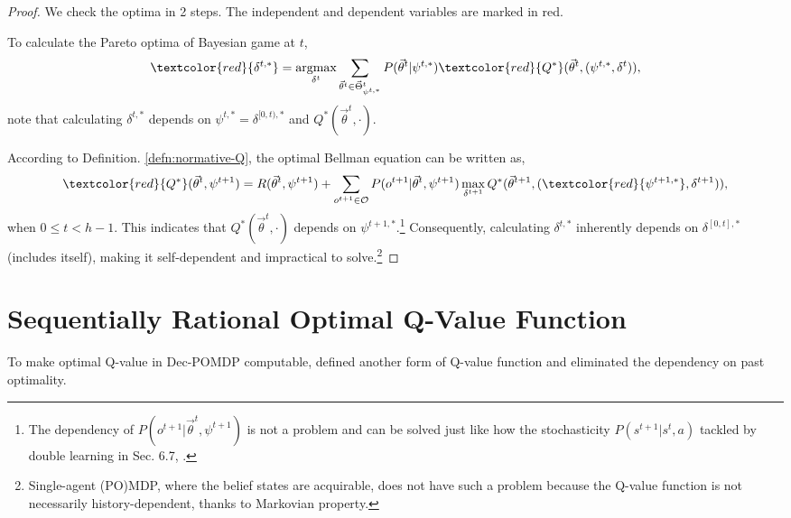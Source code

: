 \documentclass{article} %
\DeclareMathOperator*{\argmax}{argmax}
\newcommand{\obshist}{\vec{\theta}}
\newcommand{\red}[1]{\textcolor{red}{#1}}
\begin{document}
\begin{proof}
    We check the optima in 2 steps. The independent and dependent variables are marked in red.
    
    To calculate the Pareto optima of Bayesian game at $t$,
    \begin{equation}
    \red{\delta^{t, *}}
    = \argmax_{\delta^t}\sum_{\obshist^t \in \vec{\Theta}^t_{\psi^{t, *}}} P(\obshist^t|\psi^{t, *}) \red{Q^*}(\obshist^t, (\psi^{t, *}, \delta^t)),
    \end{equation}
    note that calculating $\delta^{t,*}$ depends on $\psi^{t, *} = \delta^{[0, t), *}$ and $Q^*(\obshist^t, \cdot)$. 
    
    According to Definition. \ref{defn:normative-Q}, the optimal Bellman equation can be written as,
    \begin{equation}
    \red{Q^*}(\obshist^t, \psi^{t+1}) = R(\obshist^t, \psi^{t+1}) + \sum_{o^{t+1} \in \mathcal{O}} P(o^{t+1}|\obshist^t, \psi^{t+1}) \max_{\delta^{t+1}}Q^*(\obshist^{t+1}, (\red{\psi^{t+1, *}}, \delta^{t+1})),
    \end{equation}
    when $0\leqslant t < h-1$. This indicates that $Q^*(\obshist^t, \cdot)$ depends on $\psi^{t+1, *}$.\footnote{The dependency of $P(o^{t+1}|\obshist^t, \psi^{t+1})$ is not a problem and can be solved just like how the stochasticity $P(s^{t+1}|s^t, a)$ tackled by double learning in Sec. 6.7, \cite{sutton2018reinforcement}.} Consequently, calculating $\delta^{t,*}$ inherently depends on $\delta^{[0, t], *}$ (includes itself), making it self-dependent and impractical to solve.\footnote{Single-agent (PO)MDP, where the belief states are acquirable, does not have such a problem because the Q-value function is not necessarily history-dependent, thanks to Markovian property.}
\end{proof}

\section{Sequentially Rational Optimal Q-Value Function}

To make optimal Q-value in Dec-POMDP computable, \cite{Oliehoek08JAIR} defined another form of Q-value function and eliminated the dependency on past optimality.
\end{document}
